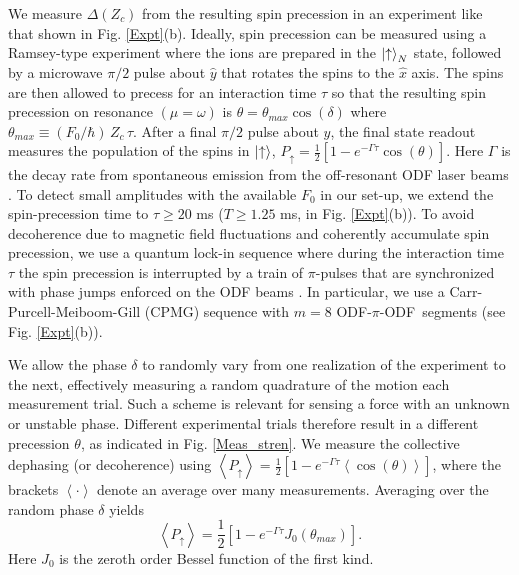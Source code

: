 \documentclass[aps,prl,twocolumn,superscriptaddress,floatfix]{revtex4-1}
\begin{document}
We measure $\Delta(Z_c)$ from the resulting spin precession in an experiment like that shown in Fig. \ref{Expt}(b). Ideally, spin precession can be measured using a Ramsey-type experiment where the ions are prepared in the $\ket{\uparrow}_N$ state, followed by a microwave $\pi/2$ pulse about $\hat{y}$ that rotates the spins to the $\hat{x}$ axis. The spins are then allowed to precess for an interaction time $\tau$ so that the resulting spin precession on resonance $(\mu = \omega)$ is $\theta = \theta_{max} \cos(\delta)$ where $\theta_{max} \equiv (F_{0}/\hbar)\, Z_c \, \tau$. After a final $\pi/2$ pulse about $\hat{y}$, the final state readout measures the population of the spins in $\ket{\uparrow}$, $P_{\uparrow} = \frac{1}{2}[1-e^{-\Gamma \tau}\cos(\theta)]$. Here $\Gamma$ is the decay rate from spontaneous emission from the off-resonant ODF laser beams \citep{Uys2010}. To detect small amplitudes with the available $F_0$ in our set-up, we extend the spin-precession time to $\tau \ge 20$ ms ($T \ge 1.25$ ms, in Fig. \ref{Expt}(b)). To avoid decoherence due to magnetic field fluctuations and coherently accumulate spin precession, we use a quantum lock-in \citep{Kotler2011} sequence where during the interaction time $\tau$ the spin precession is interrupted by a train of $\pi$-pulses that are synchronized with phase jumps enforced on the ODF beams \citep{SuppMat}. In particular, we use a Carr-Purcell-Meiboom-Gill (CPMG) sequence with $m = 8$ \mbox{ODF-$\pi$-ODF segments} (see Fig. \ref{Expt}(b)).

We allow the phase $\delta$ to randomly vary from one realization of the experiment to the next, effectively measuring a random quadrature of the motion each measurement trial. Such a scheme is relevant for sensing a force with an unknown or unstable phase. Different experimental trials therefore result in a different precession $\theta$, as indicated in Fig. \ref{Meas_stren}. We measure the collective dephasing (or decoherence) using $\left< P_{\uparrow} \right> = \frac{1}{2}[1-e^{-\Gamma \tau} \left<\cos(\theta)\right>]$, where the brackets $ \left< \cdot \right> $ denote an average over many measurements. Averaging over the random phase $\delta$ yields~\citep{Kotler2013}
\begin{equation}
\left< P_{\uparrow} \right> = \frac{1}{2} \left[ 1-e^{-\Gamma \tau}J_0(\theta_{max}) \right].
\label{Bessel}
\end{equation}
Here $J_0$ is the zeroth order Bessel function of the first kind.
\end{document}
